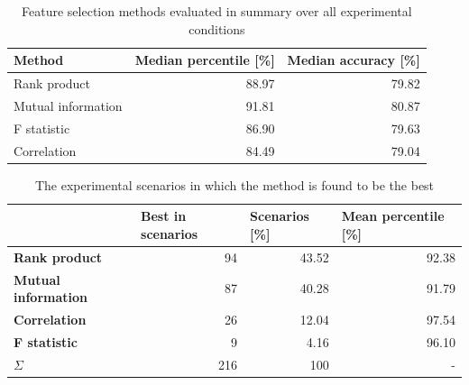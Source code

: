 \begin{table}[]
\centering
\begin{adjustbox}{width=\textwidth}
\begin{tabular}{|l|r|r|}
\hline
\textbf{Method}    & \multicolumn{1}{l|}{\textbf{Median percentile {[}\%{]}}} & \multicolumn{1}{l|}{\textbf{Median accuracy {[}\%{]}}} \\ \hline
Rank product       & 88.97                                                    & 79.82                                                 \\ \hline
Mutual information & 91.81                                                    & 80.87                                                 \\ \hline
F statistic        & 86.90                                                    & 79.63                                                 \\ \hline
Correlation        & 84.49                                                    & 79.04                                                  \\ \hline
\end{tabular}
\end{adjustbox}
\caption{Feature selection methods evaluated in summary over all experimental conditions}
\label{tab:evaluation:compare-fsel-accuracy}
\end{table}

\begin{table}[]
\centering
\begin{adjustbox}{width=\textwidth}
\begin{tabular}{|l|r|r|r|}
\hline
                            & \multicolumn{1}{l|}{\textbf{Best in scenarios}} & \multicolumn{1}{l|}{\textbf{Scenarios {[}\%{]}}} & \multicolumn{1}{l|}{\textbf{Mean percentile {[}\%{]}}} \\ \hline
\textbf{Rank product}       & 94                                                     & 43.52                                            & 92.38 \\ \hline
\textbf{Mutual information} & 87                                                      & 40.28                                            & 91.79 \\ \hline
\textbf{Correlation}        & 26                                                      & 12.04                                             & 97.54 \\ \hline
\textbf{F statistic}        & 9                                                       & 4.16                                             & 96.10 \\ \hline
\textbf{$\Sigma$}           & 216                                                     & 100                                       & -                                                      \\ \hline
\end{tabular}
\end{adjustbox}
\caption{The experimental scenarios in which the method is found to be the best}
\label{tab:evaluation:best-selection-method}
\end{table}

